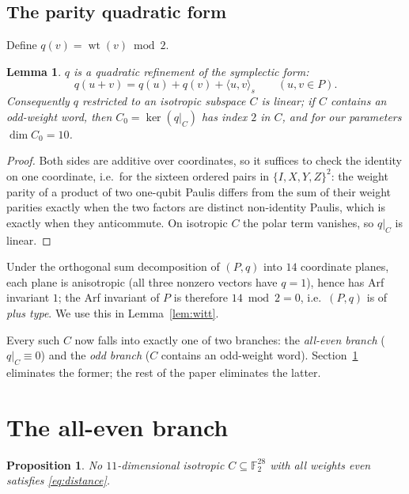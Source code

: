 \documentclass[11pt]{amsart}
\newtheorem{lemma}[theorem]{Lemma}
\newtheorem{proposition}[theorem]{Proposition}
\theoremstyle{definition}
\theoremstyle{remark}
\DeclareMathOperator{\wt}{wt}
\newcommand{\F}{\mathbb{F}}
\newcommand{\sform}[2]{\langle #1,#2\rangle_s}
\begin{document}
\subsection{The parity quadratic form}
Define $q(v)=\wt(v)\bmod 2$.

\begin{lemma}\label{lem:q}
$q$ is a quadratic refinement of the symplectic form:
\[
q(u+v)=q(u)+q(v)+\sform{u}{v} \qquad (u,v\in P).
\]
Consequently $q$ restricted to an isotropic subspace $C$ is linear; if $C$
contains an odd-weight word, then $C_0=\ker(q|_C)$ has index $2$ in $C$,
and for our parameters $\dim C_0=10$.
\end{lemma}

\begin{proof}
Both sides are additive over coordinates, so it suffices to check the
identity on one coordinate, i.e.\ for the sixteen ordered pairs in
$\{I,X,Y,Z\}^2$: the weight parity of a product of two one-qubit Paulis
differs from the sum of their weight parities exactly when the two factors
are distinct non-identity Paulis, which is exactly when they anticommute.
On isotropic $C$ the polar term vanishes, so $q|_C$ is linear.
\end{proof}

Under the orthogonal sum decomposition of $(P,q)$ into $14$ coordinate
planes, each plane is anisotropic (all three nonzero vectors have $q=1$),
hence has Arf invariant $1$; the Arf invariant of $P$ is therefore
$14\bmod 2=0$, i.e.\ $(P,q)$ is of \emph{plus type}.  We use this in
Lemma~\ref{lem:witt}.

Every such $C$ now falls into exactly one of two branches: the
\emph{all-even branch} ($q|_C\equiv 0$) and the \emph{odd branch}
($C$ contains an odd-weight word).  Section~\ref{sec:even} eliminates the
former; the rest of the paper eliminates the latter.

\section{The all-even branch}\label{sec:even}

\begin{proposition}\label{prop:even}
No $11$-dimensional isotropic $C\subseteq\F_2^{28}$ with all weights even
satisfies \eqref{eq:distance}.
\end{proposition}
\end{document}
